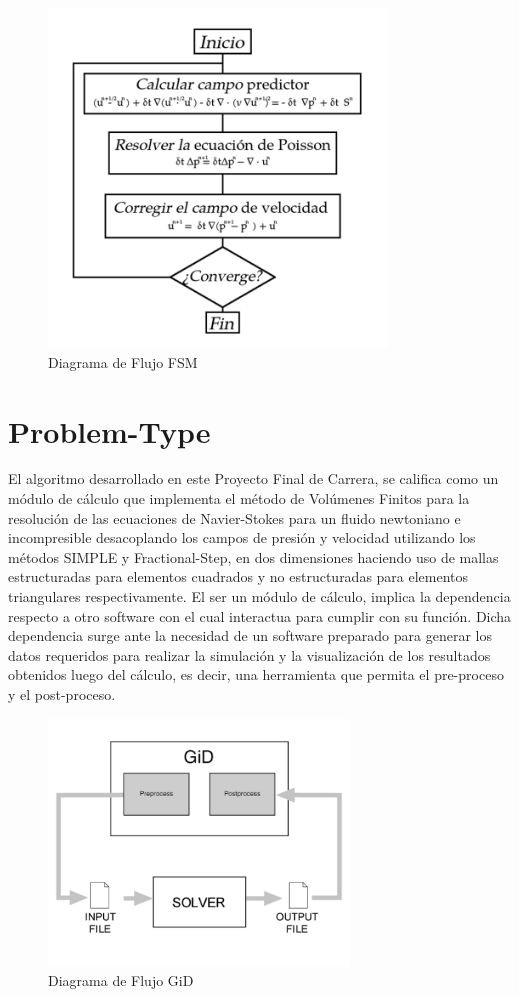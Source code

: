 \documentclass[a4paper,10pt, oneside]{book}
\begin{document}
\begin{figure}[h!]
  \centering
  \includegraphics[width=9cm]{Img/7-8}
  \caption{Diagrama de Flujo FSM}
\end{figure}

\chapter{Problem-Type}

El algoritmo desarrollado en este Proyecto Final de Carrera, se califica como un módulo de cálculo que implementa el método de Volúmenes Finitos para la resolución de las ecuaciones de Navier-Stokes para un fluido newtoniano e incompresible desacoplando los campos de presión y velocidad utilizando los métodos SIMPLE y Fractional-Step, en dos dimensiones haciendo uso de mallas estructuradas para elementos cuadrados y no estructuradas para elementos triangulares respectivamente. El ser un módulo de cálculo, implica la dependencia respecto a otro software con el cual interactua para cumplir con su función. Dicha dependencia surge ante la necesidad de un software preparado para generar los datos requeridos para realizar la simulación y la visualización de los resultados obtenidos luego del cálculo, es decir, una herramienta que permita el pre-proceso y el post-proceso.
\begin{figure}[h!]
  \centering
  \includegraphics[width=8cm]{Img/8-1}
  \caption{Diagrama de Flujo GiD}
  \label{fig:flujoGiD}
\end{figure}
\end{document}
